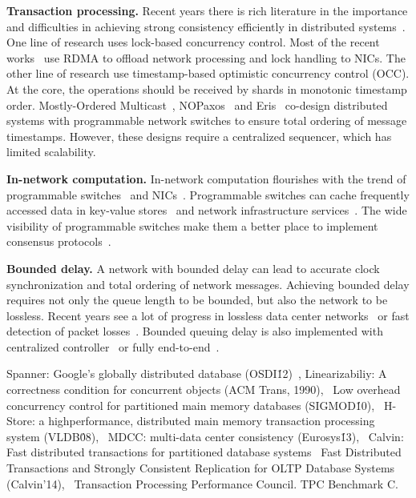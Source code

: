 \textbf{Transaction processing.}
Recent years there is rich literature in the importance and difficulties in achieving strong consistency efficiently in distributed systems~\cite{lloyd2011don,lloyd2013stronger,mu2014extracting,zhang2016operation,lu2015existential,ajoux2015challenges,mu2016consolidating,lu2016snow,kallman2008h,zhang2015building}.
One line of research uses lock-based concurrency control. Most of the recent works~\cite{dragojevic2014farm,kalia2016fasst,kaminsky2016design,dragojevic2015no} use RDMA to offload network processing and lock handling to NICs.
The other line of research use timestamp-based optimistic concurrency control (OCC).
At the core, the operations should be received by shards in monotonic timestamp order.
Mostly-Ordered Multicast~\cite{ports2015designing}, NOPaxos~\cite{li2016just} and Eris~\cite{eris} co-design distributed systems with programmable network switches to ensure total ordering of message timestamps. However, these designs require a centralized sequencer, which has limited scalability.

\textbf{In-network computation.}
In-network computation flourishes with the trend of programmable switches~\cite{lu2011serverswitch,tofino,bosshart2013forwarding} and NICs~\cite{kaufmann2016high,clicknp}.
Programmable switches can cache frequently accessed data in key-value stores~\cite{li2016fast,netcache-sosp17,kv-direct} and network infrastructure services~\cite{fayazbakhsh2013less,liu2017incbricks,miao2017silkroad}.
The wide visibility of programmable switches make them a better place to implement consensus protocols~\cite{dang2016network,dang2016paxos,dang2015netpaxos}.

\textbf{Bounded delay.}
A network with bounded delay can lead to accurate clock synchronization and total ordering of network messages.
Achieving bounded delay requires not only the queue length to be bounded, but also the network to be lossless.
Recent years see a lot of progress in lossless data center networks~\cite{calder2013don,cheng2014catch,handley2017re} or fast detection of packet losses~\cite{li2016lossradar}.
Bounded queuing delay is also implemented with centralized controller~\cite{perry2015fastpass} or fully end-to-end~\cite{cho2017credit}.




\iffalse


Spanner: Google’s globally distributed database (OSDI\'12)~\cite{corbett2013spanner},
Linearizabiliy: A correctness condition for concurrent objects (ACM Trans, 1990),~\cite{herlihy1990linearizability}
Low overhead concurrency control for partitioned main memory databases (SIGMOD\'10),~\cite{jones2010low}
H-Store: a highperformance,
distributed main memory transaction processing
system (VLDB\'08),~\cite{kallman2008h}
MDCC: multi-data center consistency (Eurosys\'13),~\cite{kraska2013mdcc}
Calvin: Fast distributed transactions for
partitioned database systems~\cite{thomson2012calvin}
Fast Distributed Transactions and Strongly Consistent Replication
for OLTP Database Systems (Calvin'14),~\cite{thomson2014fast}
Transaction Processing Performance Council. TPC
Benchmark C.~\cite{council2005transaction}

